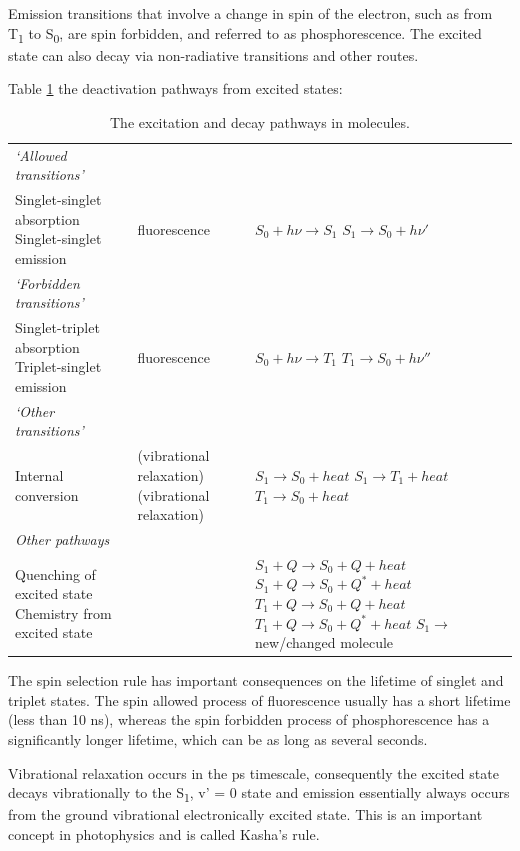 \documentclass[
]{book}
\begin{document}
Emission transitions that involve a change in spin of the electron, such as from T\textsubscript{1} to S\textsubscript{0}, are spin forbidden, and referred to as phosphorescence. The excited state can also decay via non-radiative transitions and other routes.

Table \ref{tab:phototrans} the deactivation pathways from excited states:

\begin{longtable}[]{@{}
  >{\raggedright\arraybackslash}p{}
  >{\raggedright\arraybackslash}p{}
  >{\raggedright\arraybackslash}p{}@{}}
\caption{\label{tab:phototrans} The excitation and decay pathways in molecules.}\tabularnewline
\toprule
\endhead
\emph{`Allowed transitions'} & & \\
Singlet-singlet absorption Singlet-singlet emission & fluorescence & \(S_0 + h \nu \longrightarrow S_1\) \(S_1 \longrightarrow S_0 + h \nu '\) \\
\emph{`Forbidden transitions'} & & \\
Singlet-triplet absorption Triplet-singlet emission & fluorescence & \(S_0 + h \nu \longrightarrow T_1\) \(T_1 \longrightarrow S_0 + h \nu ''\) \\
\emph{`Other transitions'} & & \\
Internal conversion & (vibrational relaxation) (vibrational relaxation) & \(S_1 \longrightarrow S_0 + heat\) \(S_1 \longrightarrow T_1 + heat\) \(T_1 \longrightarrow S_0 + heat\) \\
\emph{Other pathways} & & \\
Quenching of excited state Chemistry from excited state & & \(S_1 + Q \longrightarrow S_0 + Q +heat\) \(S_1 + Q \longrightarrow S_0 + Q^\ast +heat\) \(T_1 + Q \longrightarrow S_0 + Q +heat\) \(T_1 + Q \longrightarrow S_0 + Q^\ast +heat\) \(S_1 \longrightarrow\) new/changed molecule \\
\bottomrule
\end{longtable}

The spin selection rule has important consequences on the lifetime of singlet and triplet states. The spin allowed process of fluorescence usually has a short lifetime (less than 10 ns), whereas the spin forbidden process of phosphorescence has a significantly longer lifetime, which can be as long as several seconds.

Vibrational relaxation occurs in the ps timescale, consequently the excited state decays vibrationally to the S\textsubscript{1}, v' = 0 state and emission essentially always occurs from the ground vibrational electronically excited state. This is an important concept in photophysics and is called Kasha's rule.
\end{document}
